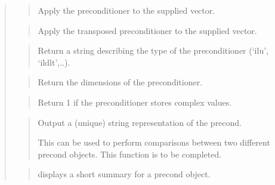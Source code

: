 \documentclass[a4paper,11pt,english]{sphinxmanual}
\begin{document}
\sphinxAtStartPar
{}
\begin{quote}

\sphinxAtStartPar
{}
\begin{quote}

\sphinxAtStartPar
Apply the preconditioner to the supplied vector.
\end{quote}

\sphinxAtStartPar
{}
\begin{quote}

\sphinxAtStartPar
Apply the transposed preconditioner to the supplied vector.
\end{quote}

\sphinxAtStartPar
{}
\begin{quote}

\sphinxAtStartPar
Return a string describing the type of the preconditioner (‘ilu’, ‘ildlt’,..).
\end{quote}

\sphinxAtStartPar
{}
\begin{quote}

\sphinxAtStartPar
Return the dimensions of the preconditioner.
\end{quote}

\sphinxAtStartPar
{}
\begin{quote}

\sphinxAtStartPar
Return 1 if the preconditioner stores complex values.
\end{quote}

\sphinxAtStartPar
{}
\begin{quote}

\sphinxAtStartPar
Output a (unique) string representation of the precond.

\sphinxAtStartPar
This can be used to perform comparisons between two
different precond objects.
This function is to be completed.
\end{quote}

\sphinxAtStartPar
{}
\begin{quote}

\sphinxAtStartPar
displays a short summary for a precond object.
\end{quote}
\end{quote}
\end{document}

